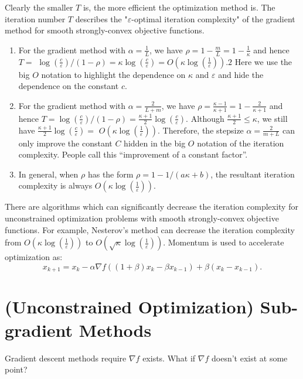 \documentclass[11pt,a4paper]{article}
\begin{document}
Clearly the smaller $T$ is, the more efficient the optimization method is. The iteration number $T$ describes the "$\varepsilon$-optimal iteration complexity" of the gradient method for smooth strongly-convex objective functions.
\begin{enumerate}[$\bullet$]
    \item For the gradient method with $\alpha=\frac{1}{L}$, we have $\rho=1-\frac{m}{L}=1-\frac{1}{\kappa}$ and hence $T=$ $\log \left(\frac{c}{\varepsilon}\right) /(1-\rho)=\kappa \log \left(\frac{c}{\varepsilon}\right)=O\left(\kappa \log \left(\frac{1}{\varepsilon}\right)\right) .2$ Here we use the big $O$ notation to highlight the dependence on $\kappa$ and $\varepsilon$ and hide the dependence on the constant $c$.
    \item For the gradient method with $\alpha=\frac{2}{L+m}$, we have $\rho=\frac{\kappa-1}{\kappa+1}=1-\frac{2}{\kappa+1}$ and hence $T=\log \left(\frac{c}{\varepsilon}\right) /(1-\rho)=\frac{\kappa+1}{2} \log \left(\frac{c}{\varepsilon}\right) .$ Although $\frac{\kappa+1}{2} \leq \kappa$, we still have $\frac{\kappa+1}{2} \log \left(\frac{c}{\varepsilon}\right)=$ $O\left(\kappa \log \left(\frac{1}{\varepsilon}\right)\right)$. Therefore, the stepsize $\alpha=\frac{2}{m+L}$ can only improve the constant $C$ hidden in the big $O$ notation of the iteration complexity. People call this “improvement of a constant factor”.
    \item In general, when $\rho$ has the form $\rho=1-1 /(a \kappa+b)$, the resultant iteration complexity is always $O\left(\kappa \log \left(\frac{1}{\varepsilon}\right)\right)$.
\end{enumerate}

There are algorithms which can significantly decrease the iteration complexity for unconstrained optimization problems with smooth strongly-convex objective functions. For example, Nesterov's method can decrease the iteration complexity from $O\left(\kappa \log \left(\frac{1}{\varepsilon}\right)\right)$ to $O\left(\sqrt{\kappa} \log \left(\frac{1}{\varepsilon}\right)\right)$. Momentum is used to accelerate optimization as:
$$
x_{k+1}=x_{k}-\alpha \nabla f\left((1+\beta) x_{k}-\beta x_{k-1}\right)+\beta\left(x_{k}-x_{k-1}\right) .
$$

\section{(Unconstrained Optimization) Sub-gradient Methods}
Gradient descent methods require $\nabla f$ exists. What if $\nabla f$ doesn't exist at some point?
\end{document}
